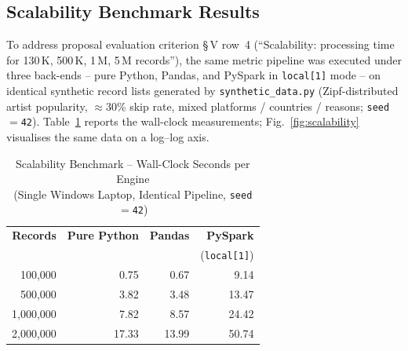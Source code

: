 \documentclass[conference]{IEEEtran}
\begin{document}
\subsection{Scalability Benchmark Results}

To address proposal evaluation criterion \S\,V row~4 (``Scalability: processing time for 130\,K, 500\,K, 1\,M, 5\,M records''), the same metric pipeline was executed under three back-ends -- pure Python, Pandas, and PySpark in \texttt{local[1]} mode -- on identical synthetic record lists generated by \texttt{synthetic\_data.py} (Zipf-distributed artist popularity, $\approx$30\% skip rate, mixed platforms / countries / reasons; \texttt{seed${=}$42}). Table~\ref{tab:scalability} reports the wall-clock measurements; Fig.~\ref{fig:scalability} visualises the same data on a log--log axis.

\begin{table}[ht]
\centering
\caption{Scalability Benchmark -- Wall-Clock Seconds per Engine\\ (Single Windows Laptop, Identical Pipeline, \texttt{seed${=}$42})}
\label{tab:scalability}
\renewcommand{\arraystretch}{1.2}
\begin{tabular}{r r r r}
\toprule
\textbf{Records} & \textbf{Pure Python} & \textbf{Pandas} & \textbf{PySpark} \\
                 &                      &                 & (\texttt{local[1]}) \\
\midrule
100{,}000   & 0.75   & 0.67   & 9.14  \\
500{,}000   & 3.82   & 3.48   & 13.47 \\
1{,}000{,}000 & 7.82   & 8.57   & 24.42 \\
2{,}000{,}000 & 17.33  & 13.99  & 50.74 \\
\bottomrule
\end{tabular}
\end{table}
\end{document}

